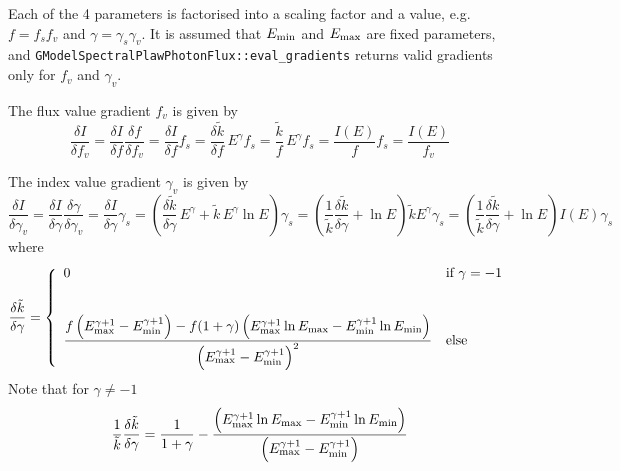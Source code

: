 \documentclass{article}[12pt,a4]
\begin{document}
Each of the 4 parameters is factorised into a scaling factor and a value, e.g.
$f=f_s f_v$ and $\gamma=\gamma_s \gamma_v$.
It is assumed that $E_{\rm min}$ and $E_{\rm max}$ are fixed parameters,
and {\tt GModelSpectralPlawPhotonFlux::eval\_gradients} returns valid gradients only for 
$f_v$ and $\gamma_v$.

The flux value gradient $f_v$ is given by
\begin{equation}
\frac{\delta I}{\delta f_v} = 
  \frac{\delta I}{\delta f} \frac{\delta f}{\delta f_v} = 
  \frac{\delta I}{\delta f} f_s = 
  \frac{\delta \tilde{k}}{\delta f} \, E^{\gamma} f_s = 
  \frac{\tilde{k}}{f} \, E^{\gamma} f_s = 
  \frac{I(E)}{f} f_s =
  \frac{I(E)}{f_v}
\end{equation}

The index value gradient $\gamma_v$ is given by
\begin{equation}
\frac{\delta I}{\delta \gamma_v} =
  \frac{\delta I}{\delta \gamma} \frac{\delta \gamma}{\delta \gamma_v} = 
  \frac{\delta I}{\delta \gamma} \gamma_s = 
  \left( \frac{\delta \tilde{k}}{\delta \gamma} \, E^{\gamma} + \tilde{k} \, E^{\gamma} \ln E \right)  \gamma_s =
  \left( \frac{1}{\tilde{k}} \frac{\delta \tilde{k}}{\delta \gamma} + \ln E \right) \tilde{k} E^{\gamma} \gamma_s =
  \left( \frac{1}{\tilde{k}} \frac{\delta \tilde{k}}{\delta \gamma} + \ln E \right) I(E) \gamma_s
\end{equation}
where
\begin{equation}
   \frac{\delta \tilde{k}}{\delta \gamma} = \left \{
   \begin{array}{l l}
     \displaystyle
     0 & \mbox{if $\gamma = -1$} \\
     \\
     \\
     \displaystyle
      \frac{f \left( E_{\rm max}^{\gamma+1}-E_{\rm min}^{\gamma+1} \right) -
              f (1+\gamma) \left( E_{\rm max}^{\gamma+1} \ln E_{\rm max} - 
                                      E_{\rm min}^{\gamma+1} \ln E_{\rm min} \right)}
              {\left( E_{\rm max}^{\gamma+1}-E_{\rm min}^{\gamma+1} \right)^2}
         & \mbox{else}
   \end{array}
   \right .
\end{equation}
Note that for $\gamma \ne -1$
\begin{equation}
\frac{1}{\tilde{k}} \frac{\delta \tilde{k}}{\delta \gamma} =
  \frac{1}{1+\gamma} -
  \frac{\left( E_{\rm max}^{\gamma+1} \ln E_{\rm max} - 
                    E_{\rm min}^{\gamma+1} \ln E_{\rm min} \right)}
          {\left( E_{\rm max}^{\gamma+1}-E_{\rm min}^{\gamma+1} \right)}
\end{equation}
\end{document}
